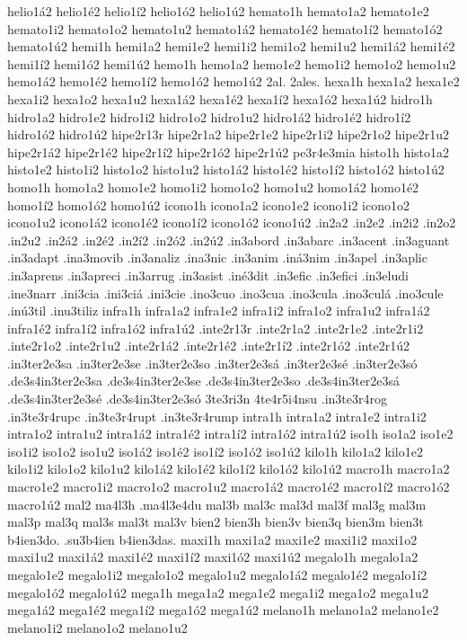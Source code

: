{helio1á2 helio1é2 helio1í2 helio1ó2 helio1ú2
hemato1h
hemato1a2 hemato1e2 hemato1i2 hemato1o2 hemato1u2
hemato1á2 hemato1é2 hemato1í2 hemato1ó2 hemato1ú2
hemi1h
hemi1a2 hemi1e2 hemi1i2 hemi1o2 hemi1u2
hemi1á2 hemi1é2 hemi1í2 hemi1ó2 hemi1ú2
hemo1h
hemo1a2 hemo1e2 hemo1i2 hemo1o2 hemo1u2
hemo1á2 hemo1é2 hemo1í2 hemo1ó2 hemo1ú2
2al.
2ales.
hexa1h
hexa1a2 hexa1e2 hexa1i2 hexa1o2 hexa1u2
hexa1á2 hexa1é2 hexa1í2 hexa1ó2 hexa1ú2
hidro1h
hidro1a2 hidro1e2 hidro1i2 hidro1o2 hidro1u2
hidro1á2 hidro1é2 hidro1í2 hidro1ó2 hidro1ú2
hipe2r13r
hipe2r1a2 hipe2r1e2 hipe2r1i2 hipe2r1o2 hipe2r1u2
hipe2r1á2 hipe2r1é2 hipe2r1í2 hipe2r1ó2 hipe2r1ú2
pe3r4e3mia
histo1h
histo1a2 histo1e2 histo1i2 histo1o2 histo1u2
histo1á2 histo1é2 histo1í2 histo1ó2 histo1ú2
homo1h
homo1a2 homo1e2 homo1i2 homo1o2 homo1u2
homo1á2 homo1é2 homo1í2 homo1ó2 homo1ú2
icono1h
icono1a2 icono1e2 icono1i2 icono1o2 icono1u2
icono1á2 icono1é2 icono1í2 icono1ó2 icono1ú2
.in2a2
.in2e2
.in2i2
.in2o2
.in2u2
.in2á2
.in2é2
.in2í2
.in2ó2
.in2ú2
.in3abord
.in3abarc
.in3acent
.in3aguant
.in3adapt
.ina3movib
.in3analiz
.ina3nic
.in3anim
.iná3nim
.in3apel
.in3aplic
.in3aprens
.in3apreci
.in3arrug
.in3asist
.iné3dit
.in3efic
.in3efici
.in3eludi
.ine3narr
.ini3cia
.ini3ciá
.ini3cie
.ino3cuo
.ino3cua
.ino3cula
.ino3culá
.ino3cule
.inú3til
.inu3tiliz
infra1h
infra1a2 infra1e2 infra1i2 infra1o2 infra1u2
infra1á2 infra1é2 infra1í2 infra1ó2 infra1ú2
.inte2r13r
.inte2r1a2 .inte2r1e2 .inte2r1i2 .inte2r1o2 .inte2r1u2
.inte2r1á2 .inte2r1é2 .inte2r1í2 .inte2r1ó2 .inte2r1ú2
.in3ter2e3sa
.in3ter2e3se
.in3ter2e3so
.in3ter2e3sá
.in3ter2e3sé
.in3ter2e3só
.de3s4in3ter2e3sa
.de3s4in3ter2e3se
.de3s4in3ter2e3so
.de3s4in3ter2e3sá
.de3s4in3ter2e3sé
.de3s4in3ter2e3só
3te3ri3n
4te4r5i4nsu
.in3te3r4rog
.in3te3r4rupc
.in3te3r4rupt
.in3te3r4rump
intra1h
intra1a2 intra1e2 intra1i2 intra1o2 intra1u2
intra1á2 intra1é2 intra1í2 intra1ó2 intra1ú2
iso1h
iso1a2 iso1e2 iso1i2 iso1o2 iso1u2
iso1á2 iso1é2 iso1í2 iso1ó2 iso1ú2
kilo1h
kilo1a2 kilo1e2 kilo1i2 kilo1o2 kilo1u2
kilo1á2 kilo1é2 kilo1í2 kilo1ó2 kilo1ú2
macro1h
macro1a2 macro1e2 macro1i2 macro1o2 macro1u2
macro1á2 macro1é2 macro1í2 macro1ó2 macro1ú2
mal2
ma4l3h
.ma4l3e4du
mal3b
mal3c
mal3d
mal3f
mal3g
mal3m
mal3p
mal3q
mal3s
mal3t
mal3v
bien2
bien3h
bien3v
bien3q
bien3m
bien3t
b4ien3do.
.su3b4ien
b4ien3das.
maxi1h
maxi1a2 maxi1e2 maxi1i2 maxi1o2 maxi1u2
maxi1á2 maxi1é2 maxi1í2 maxi1ó2 maxi1ú2
megalo1h
megalo1a2 megalo1e2 megalo1i2 megalo1o2 megalo1u2
megalo1á2 megalo1é2 megalo1í2 megalo1ó2 megalo1ú2
mega1h
mega1a2 mega1e2 mega1i2 mega1o2 mega1u2
mega1á2 mega1é2 mega1í2 mega1ó2 mega1ú2
melano1h
melano1a2 melano1e2 melano1i2 melano1o2 melano1u2
}
